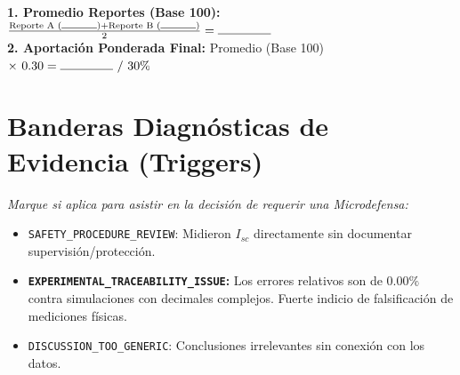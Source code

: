 \documentclass[11pt, a4paper]{article}
\begin{document}
\vspace{0.4cm}
\begin{tcolorbox}[colback=gray!5, colframe=gray!50, title=\textbf{Cálculo de Aportación}]
\textbf{1. Promedio Reportes (Base 100):} $\frac{\text{Reporte A } (\rule{1cm}{0.4pt}) + \text{Reporte B } (\rule{1cm}{0.4pt})}{2} = \mathbf{\rule{1.5cm}{0.4pt}}$ \\

\vspace{0.2cm}
\textbf{2. Aportación Ponderada Final:} Promedio (Base 100) $\times \ 0.30 = \mathbf{\rule{1.5cm}{0.4pt}} \ / \ 30\%$
\end{tcolorbox}

\vspace{0.5cm}
\section*{Banderas Diagnósticas de Evidencia (Triggers)}
\textit{Marque si aplica para asistir en la decisión de requerir una Microdefensa:}
\begin{itemize}\setlength\itemsep{0.2em}
    \item[$\square$] \texttt{SAFETY\_PROCEDURE\_REVIEW}: Midieron $I_{sc}$ directamente sin documentar supervisión/protección.
    \item[$\square$] \textbf{\texttt{EXPERIMENTAL\_TRACEABILITY\_ISSUE}:} Los errores relativos son de $0.00\%$ contra simulaciones con decimales complejos. Fuerte indicio de falsificación de mediciones físicas.
    \item[$\square$] \texttt{DISCUSSION\_TOO\_GENERIC}: Conclusiones irrelevantes sin conexión con los datos.
\end{itemize}
\end{document}
